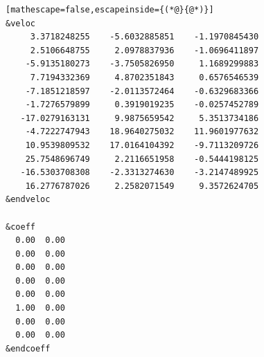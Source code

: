 \documentclass[letterpaper,12pt,titlepage]{article}
\begin{document}
\begin{appendix}
\begin{lstlisting}[mathescape=false,escapeinside={(*@}{@*)}]
&veloc
     3.3718248255    -5.6032885851    -1.1970845430
     2.5106648755     2.0978837936    -1.0696411897
    -5.9135180273    -3.7505826950     1.1689299883
     7.7194332369     4.8702351843     0.6576546539
    -7.1851218597    -2.0113572464    -0.6329683366
    -1.7276579899     0.3919019235    -0.0257452789
   -17.0279163131     9.9875659542     5.3513734186
    -4.7222747943    18.9640275032    11.9601977632
    10.9539809532    17.0164104392    -9.7113209726
    25.7548696749     2.2116651958    -0.5444198125
   -16.5303708308    -2.3313274630    -3.2147489925
    16.2776787026     2.2582071549     9.3572624705
&endveloc

&coeff
  0.00  0.00
  0.00  0.00
  0.00  0.00
  0.00  0.00
  0.00  0.00
  1.00  0.00
  0.00  0.00
  0.00  0.00
&endcoeff
\end{lstlisting}
\newpage

\end{appendix}
\end{document}
